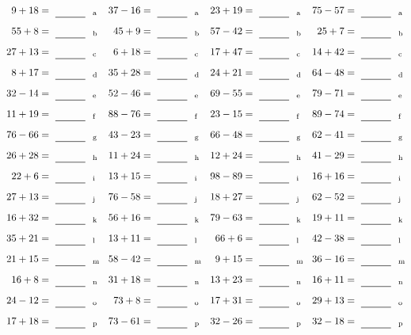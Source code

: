 \documentclass
[
  draft    = true,
  fontsize = 11pt,
  parskip  = half-
]
{scrartcl}
\begin{document}
\clearpage
\begin{align*}
    \pline{9+18}&=\rline{a}
  & \pline{37-16}&=\rline{a}
  & \pline{23+19}&=\rline{a}
  & \pline{75-57}&=\rline{a} \\[1ex]
    \pline{55+8}&=\rline{b}
  & \pline{45+9}&=\rline{b}
  & \pline{57-42}&=\rline{b}
  & \pline{25+7}&=\rline{b} \\[1ex]
    \pline{27+13}&=\rline{c}
  & \pline{6+18}&=\rline{c}
  & \pline{17+47}&=\rline{c}
  & \pline{14+42}&=\rline{c} \\[1ex]
    \pline{8+17}&=\rline{d}
  & \pline{35+28}&=\rline{d}
  & \pline{24+21}&=\rline{d}
  & \pline{64-48}&=\rline{d} \\[1ex]
    \pline{32-14}&=\rline{e}
  & \pline{52-46}&=\rline{e}
  & \pline{69-55}&=\rline{e}
  & \pline{79-71}&=\rline{e} \\[1ex]
    \pline{11+19}&=\rline{f}
  & \pline{88-76}&=\rline{f}
  & \pline{23-15}&=\rline{f}
  & \pline{89-74}&=\rline{f} \\[1ex]
    \pline{76-66}&=\rline{g}
  & \pline{43-23}&=\rline{g}
  & \pline{66-48}&=\rline{g}
  & \pline{62-41}&=\rline{g} \\[1ex]
    \pline{26+28}&=\rline{h}
  & \pline{11+24}&=\rline{h}
  & \pline{12+24}&=\rline{h}
  & \pline{41-29}&=\rline{h} \\[1ex]
    \pline{22+6}&=\rline{i}
  & \pline{13+15}&=\rline{i}
  & \pline{98-89}&=\rline{i}
  & \pline{16+16}&=\rline{i} \\[1ex]
    \pline{27+13}&=\rline{j}
  & \pline{76-58}&=\rline{j}
  & \pline{18+27}&=\rline{j}
  & \pline{62-52}&=\rline{j} \\[1ex]
    \pline{16+32}&=\rline{k}
  & \pline{56+16}&=\rline{k}
  & \pline{79-63}&=\rline{k}
  & \pline{19+11}&=\rline{k} \\[1ex]
    \pline{35+21}&=\rline{l}
  & \pline{13+11}&=\rline{l}
  & \pline{66+6}&=\rline{l}
  & \pline{42-38}&=\rline{l} \\[1ex]
    \pline{21+15}&=\rline{m}
  & \pline{58-42}&=\rline{m}
  & \pline{9+15}&=\rline{m}
  & \pline{36-16}&=\rline{m} \\[1ex]
    \pline{16+8}&=\rline{n}
  & \pline{31+18}&=\rline{n}
  & \pline{13+23}&=\rline{n}
  & \pline{16+11}&=\rline{n} \\[1ex]
    \pline{24-12}&=\rline{o}
  & \pline{73+8}&=\rline{o}
  & \pline{17+31}&=\rline{o}
  & \pline{29+13}&=\rline{o} \\[1ex]
    \pline{17+18}&=\rline{p}
  & \pline{73-61}&=\rline{p}
  & \pline{32-26}&=\rline{p}
  & \pline{32-18}&=\rline{p}
\end{align*}
\end{document}
